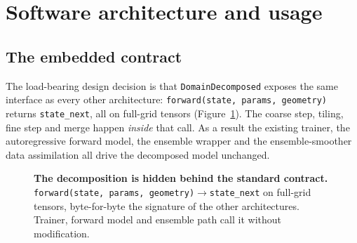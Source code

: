 \documentclass[11pt]{article}
\newcommand{\code}[1]{\texttt{#1}}
\begin{document}
\section{Software architecture and usage}\label{sec:software}

\subsection{The embedded contract}\label{sec:contract}

The load-bearing design decision is that \code{DomainDecomposed} exposes the same
interface as every other architecture: \code{forward(state, params, geometry)}
returns \code{state\_next}, all on full-grid tensors (Figure~\ref{fig:contract}).
The coarse step, tiling, fine step and merge happen \emph{inside} that call. As a
result the existing trainer, the autoregressive forward model, the ensemble wrapper
and the ensemble-smoother data assimilation all drive the decomposed model
unchanged.

\begin{figure}[t]
\centering
{}
\caption{\textbf{The decomposition is hidden behind the standard contract.}
\code{forward(state, params, geometry)$\to$state\_next} on full-grid tensors,
byte-for-byte the signature of the other architectures. Trainer, forward model and
ensemble path call it without modification.}
\label{fig:contract}
\end{figure}
\end{document}
